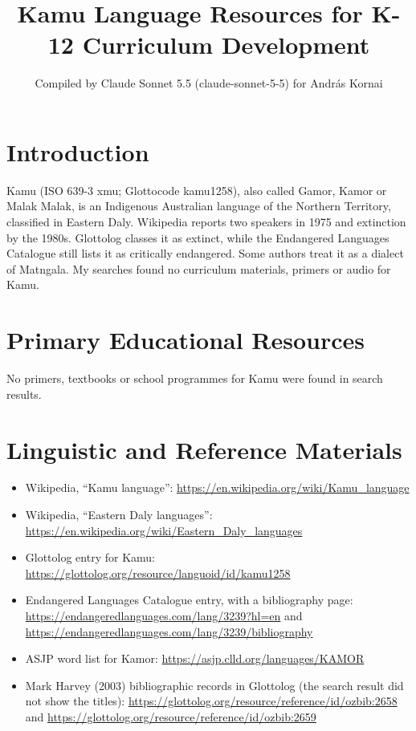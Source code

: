 \documentclass[12pt]{article}
\title{Kamu Language Resources for K-12 Curriculum Development}
\author{Compiled by Claude Sonnet 5.5 (claude-sonnet-5-5) for Andr\'as Kornai}
\date{}
\begin{document}
\maketitle

\section{Introduction}
Kamu (ISO 639-3 xmu; Glottocode kamu1258), also called Gamor, Kamor or Malak Malak, is an Indigenous Australian language of the Northern Territory, classified in Eastern Daly. Wikipedia reports two speakers in 1975 and extinction by the 1980s. Glottolog classes it as extinct, while the Endangered Languages Catalogue still lists it as critically endangered. Some authors treat it as a dialect of Matngala. My searches found no curriculum materials, primers or audio for Kamu.

\section{Primary Educational Resources}
No primers, textbooks or school programmes for Kamu were found in search results.

\section{Linguistic and Reference Materials}
\begin{itemize}
\item Wikipedia, ``Kamu language'': \url{https://en.wikipedia.org/wiki/Kamu_language}
\item Wikipedia, ``Eastern Daly languages'': \url{https://en.wikipedia.org/wiki/Eastern_Daly_languages}
\item Glottolog entry for Kamu: \url{https://glottolog.org/resource/languoid/id/kamu1258}
\item Endangered Languages Catalogue entry, with a bibliography page: \url{https://endangeredlanguages.com/lang/3239?hl=en} and \url{https://endangeredlanguages.com/lang/3239/bibliography}
\item ASJP word list for Kamor: \url{https://asjp.clld.org/languages/KAMOR}
\item Mark Harvey (2003) bibliographic records in Glottolog (the search result did not show the titles): \url{https://glottolog.org/resource/reference/id/ozbib:2658} and \url{https://glottolog.org/resource/reference/id/ozbib:2659}
\end{itemize}
\end{document}
